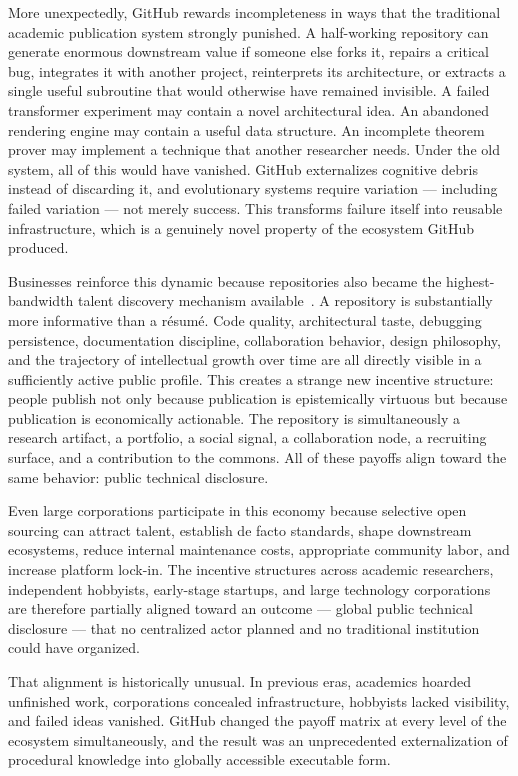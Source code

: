 \documentclass[11pt]{article}
\begin{document}
More unexpectedly, GitHub rewards incompleteness in ways that the traditional
academic publication system strongly punished. A half-working repository can
generate enormous downstream value if someone else forks it, repairs a critical
bug, integrates it with another project, reinterprets its architecture, or
extracts a single useful subroutine that would otherwise have remained invisible.
A failed transformer experiment may contain a novel architectural idea. An
abandoned rendering engine may contain a useful data structure. An incomplete
theorem prover may implement a technique that another researcher needs. Under
the old system, all of this would have vanished. GitHub externalizes cognitive
debris instead of discarding it, and evolutionary systems require variation ---
including failed variation --- not merely success. This transforms failure itself
into reusable infrastructure, which is a genuinely novel property of the
ecosystem GitHub produced.

Businesses reinforce this dynamic because repositories also became the
highest-bandwidth talent discovery mechanism available~\cite{benkler2006,raymond1999}.
A repository is substantially more informative than a r\'esum\'e. Code quality,
architectural taste, debugging persistence, documentation discipline,
collaboration behavior, design philosophy, and the trajectory of intellectual
growth over time are all directly visible in a sufficiently active public
profile. This creates a strange new incentive structure: people publish not only
because publication is epistemically virtuous but because publication is
economically actionable. The repository is simultaneously a research artifact,
a portfolio, a social signal, a collaboration node, a recruiting surface, and a
contribution to the commons. All of these payoffs align toward the same
behavior: public technical disclosure.

Even large corporations participate in this economy because selective open
sourcing can attract talent, establish de facto standards, shape downstream
ecosystems, reduce internal maintenance costs, appropriate community labor, and
increase platform lock-in. The incentive structures across academic researchers,
independent hobbyists, early-stage startups, and large technology corporations
are therefore partially aligned toward an outcome --- global public technical
disclosure --- that no centralized actor planned and no traditional institution
could have organized.

That alignment is historically unusual. In previous eras, academics hoarded
unfinished work, corporations concealed infrastructure, hobbyists lacked
visibility, and failed ideas vanished. GitHub changed the payoff matrix at every
level of the ecosystem simultaneously, and the result was an unprecedented
externalization of procedural knowledge into globally accessible executable form.
\end{document}
